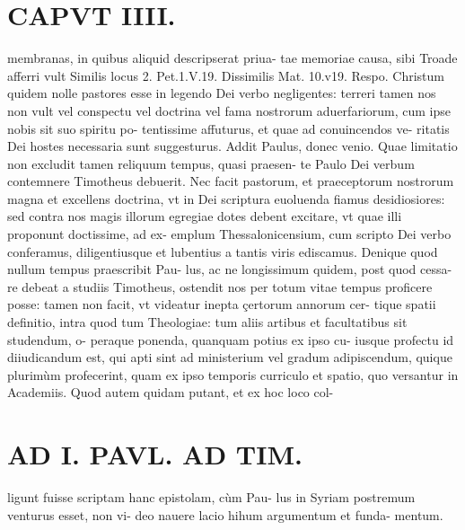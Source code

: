 \documentclass{article}
\begin{document}
\begin{pages}
\section*{CAPVT  IIII. }
\marginpar{[ p.233 ]}\pstart membranas, in quibus aliquid descripserat priua- tae memoriae causa, sibi Troade afferri vult Similis locus 2. Pet.1.V.19. Dissimilis Mat. 10.v19. Respo. Christum quidem nolle pastores esse in legendo Dei verbo negligentes: terreri tamen nos non vult vel conspectu vel doctrina vel fama nostrorum aduerfariorum, cum ipse nobis sit suo spiritu po- tentissime affuturus, et quae ad conuincendos ve- ritatis Dei hostes necessaria sunt suggesturus.  \pend\pstart Addit Paulus, donec venio. Quae limitatio non excludit tamen reliquum tempus, quasi praesen- te Paulo Dei verbum contemnere Timotheus debuerit. Nec facit pastorum, et praeceptorum nostrorum magna et excellens doctrina, vt in Dei scriptura euoluenda fiamus desidiosiores: sed contra nos magis illorum egregiae dotes debent excitare, vt quae illi proponunt doctissime, ad ex- emplum Thessalonicensium, cum scripto Dei verbo conferamus, diligentiusque et lubentius a tantis viris ediscamus.  \pend\pstart Denique quod nullum tempus praescribit Pau- lus, ac ne longissimum quidem, post quod cessa- re debeat a studiis Timotheus, ostendit nos per totum vitae tempus proficere posse: tamen non facit, vt videatur inepta çertorum annorum cer- tique spatii definitio, intra quod tum Theologiae: tum aliis artibus et facultatibus sit studendum, o- peraque ponenda, quanquam potius ex ipso cu- iusque profectu id diiudicandum est, qui apti sint ad ministerium vel gradum adipiscendum, quique  plurimùm profecerint, quam ex ipso temporis curriculo et spatio, quo versantur in Academiis. Quod autem quidam putant, et ex hoc loco col-  \pend
\section*{AD I. PAVL. AD TIM. }
\marginpar{[ p.254 ]}\pstart ligunt fuisse scriptam hanc epistolam, cùm Pau- lus in Syriam postremum venturus esset, non vi- deo nauere lacio hihum argumentum et funda- mentum.  \pend
{}
{}

\end{pages}
\end{document}
